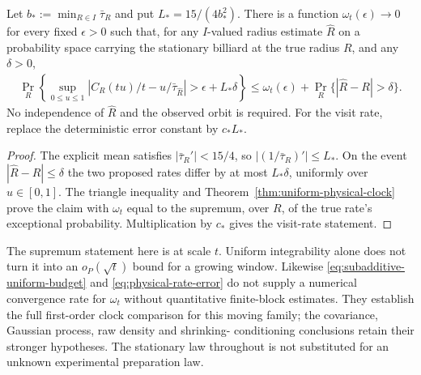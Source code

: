\begin{corollary}
\label{cor:physical-rate-error}
Let $b_*:=\min_{R\in I}\bar\tau_R$ and put
$L_*=15/(4b_*^2)$. There is a function $\omega_t(\epsilon)\to0$
for every fixed $\epsilon>0$ such that, for any $I$-valued radius
estimate $\widehat R$ on a probability space carrying the stationary
billiard at the true radius $R$, and any $\delta>0$,
\begin{align}\label{eq:physical-rate-error}
 \Pr_R\left\{\sup_{0\le u\le1}
 \left|C_R(tu)/t-u/\bar\tau_{\widehat R}\right|
                       >\epsilon+L_*\delta\right\}
 \le\omega_t(\epsilon)+\Pr_R\{|\widehat R-R|>\delta\}.
\end{align}
No independence of $\widehat R$ and the observed orbit is required.
For the visit rate, replace the deterministic error constant by $c_*L_*$.
\end{corollary}
\begin{proof}
The explicit mean satisfies $|\bar\tau_R'|<15/4$, so
$|(1/\bar\tau_R)'|\le L_*$. On the event
$|\widehat R-R|\le\delta$ the two proposed rates differ by at
most $L_*\delta$, uniformly over $u\in[0,1]$. The triangle
inequality and Theorem~\ref{thm:uniform-physical-clock} prove the
claim with $\omega_t$ equal to the supremum, over $R$, of the true
rate's exceptional probability. Multiplication by $c_*$ gives the
visit-rate statement.
\end{proof}

The supremum statement here is at scale $t$. Uniform integrability
alone does not turn it into an $o_P(\sqrt t)$ bound for a growing
window. Likewise \eqref{eq:subadditive-uniform-budget} and
\eqref{eq:physical-rate-error} do not supply a numerical convergence
rate for $\omega_t$ without quantitative finite-block estimates.
They establish the full first-order clock comparison for this moving
family; the covariance, Gaussian process, raw density and shrinking-
conditioning conclusions retain their stronger hypotheses. The
stationary law throughout is not substituted for an unknown experimental
preparation law.
